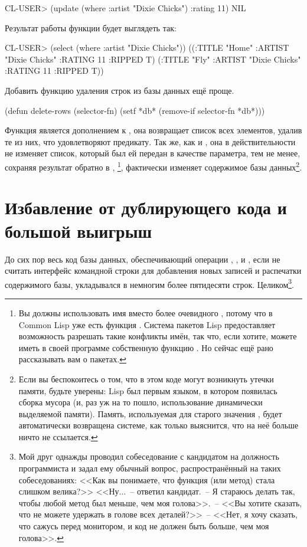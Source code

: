 \begin{myverb}
  CL-USER> (update (where :artist "Dixie Chicks") :rating 11)
  NIL
\end{myverb}

Результат работы функции будет выглядеть так:

\begin{myverb}
  CL-USER> (select (where :artist "Dixie Chicks"))
  ((:TITLE "Home" :ARTIST "Dixie Chicks" :RATING 11 :RIPPED T)
   (:TITLE "Fly" :ARTIST "Dixie Chicks" :RATING 11 :RIPPED T))
\end{myverb}

Добавить функцию удаления строк из базы данных ещё проще.

\begin{myverb}
(defun delete-rows (selector-fn)
  (setf *db* (remove-if selector-fn *db*)))
\end{myverb}

Функция  является дополнением к , она возвращает
список всех элементов, удалив те из них, что удовлетворяют предикату. Так же, как и
, она в действительности не изменяет список, который был ей передан
в качестве параметра, тем не менее, сохраняя результат обратно в ,
\footnote{Вы должны использовать имя  вместо более
  очевидного , потому что в Common Lisp уже есть функция
  . Система пакетов Lisp предоставляет возможность разрешать такие
  конфликты имён, так что, если хотите, можете иметь в своей программе собственную функцию
  . Но сейчас ещё рано рассказывать вам о пакетах.}, фактически изменяет
содержимое базы данных\footnote{Если вы беспокоитесь о том, что в этом коде могут
  возникнуть утечки памяти, будьте уверены: Lisp был первым языком, в котором появилась
  сборка мусора (и, раз уж на то пошло, использование динамически выделяемой
  памяти). Память, используемая для старого значения , будет автоматически возвращена
  системе, как только выяснится, что на неё больше ничто не ссылается.}.

\section{Избавление от дублирующего кода и большой выигрыш}

До сих пор весь код базы данных, обеспечивающий операции , ,
 и , если не считать интерфейс командной строки для добавления
новых записей и распечатки содержимого базы, укладывался в немногим более пятидесяти
строк. Целиком\footnote{Мой друг однажды проводил собеседование с кандидатом на должность
  программиста и задал ему обычный вопрос, распространённый на таких собеседованиях: <<Как
  вы понимаете, что функция (или метод) стала слишком велика?>> <<Ну...~-- ответил
  кандидат.~-- Я стараюсь делать так, чтобы любой метод был меньше, чем моя голова>>.~--  <<Вы
  хотите сказать, что не можете удержать в голове всех деталей?>>~-- <<Нет, я хочу сказать,
  что сажусь перед монитором, и код не должен быть больше, чем моя голова>>.}.

